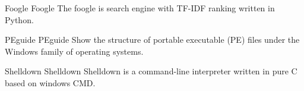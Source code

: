 

\begin{cventries}

  \cventryproject
    {Foogle}
    {Foogle}
    {The foogle is search engine with TF-IDF ranking written in Python.}

  \cventryproject
    {PEguide}
    {PEguide}
    {Show the structure of portable executable (PE) files under the Windows family of operating systems.}

  \cventryproject
    {Shelldown}
    {Shelldown}
    {Shelldown is a command-line interpreter written in pure C based on windows CMD.}
\end{cventries}
